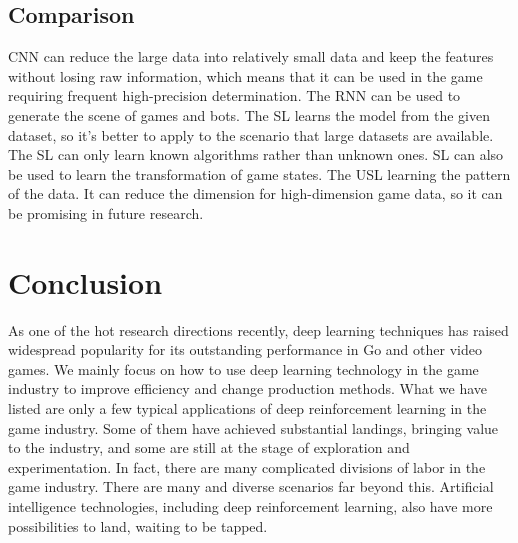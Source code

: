 \documentclass[11pt,en]{elegantpaper}
\begin{document}
\subsection{Comparison}
CNN can reduce the large data into relatively small data and keep the features without losing raw information, which means that it can be used in the game requiring frequent high-precision determination. The RNN can be used to generate the scene of games and bots. The SL learns the model from the given dataset, so it's better to apply to the scenario that large datasets are available. The SL can only learn known algorithms rather than unknown ones. SL can also be used to learn the transformation of game states. The USL learning the pattern of the data. It can reduce the dimension for high-dimension game data, so it can be promising in future research. 

\section{Conclusion}
As one of the hot research directions recently, deep learning techniques has raised widespread popularity for its outstanding performance in Go and other video games. We mainly focus on how to use deep learning technology in the game industry to improve efficiency and change production methods. What we have listed are only a few typical applications of deep reinforcement learning in the game industry. Some of them have achieved substantial landings, bringing value to the industry, and some are still at the stage of exploration and experimentation. In fact, there are many complicated divisions of labor in the game industry. There are many and diverse scenarios far beyond this. Artificial intelligence technologies, including deep reinforcement learning, also have more possibilities to land, waiting to be tapped.


\end{document}
